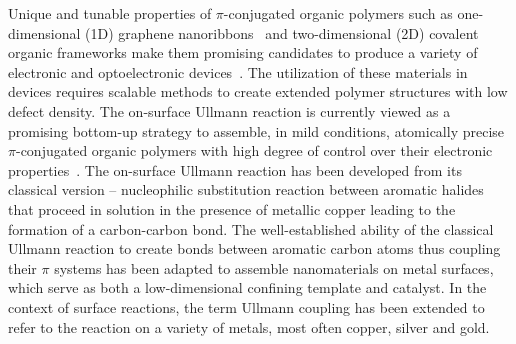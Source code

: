 \documentclass[%
 reprint,
 amsmath,amssymb,
 aps,
prb,
floatfix,
]{revtex4-2}
\newcommand{\lock}{\color{red}}
\newcommand{\lock}{\color{black}}
\newcommand{\comm}{\color{Purple}} %
\begin{document}
{\lock


Unique and tunable properties of $\pi$-conjugated organic polymers such as one-dimensional (1D) graphene nanoribbons~\cite{ullmann_106, ullmann_45, ullmann_107, ullmann_101}
and two-dimensional (2D) covalent organic frameworks 
make them promising candidates to produce a variety of electronic and optoelectronic devices~\cite{ullmann_113, ullmann_114}.
%
The utilization of these materials in devices requires scalable methods to create extended polymer structures with low defect density.
%
The on-surface Ullmann reaction is currently viewed as a promising bottom-up strategy to assemble, in mild conditions, atomically precise $\pi$-conjugated organic polymers with high degree of control over their electronic properties~\cite{ullmann_33}. 
%
%
The on-surface Ullmann reaction has been developed from its classical version -- nucleophilic substitution reaction between aromatic halides that proceed in solution in the presence of metallic copper leading to the formation of a carbon-carbon bond. 
The well-established ability of the classical Ullmann reaction to create bonds between aromatic carbon atoms thus coupling their $\pi$ systems has been adapted to assemble nanomaterials on metal surfaces, which serve as both a low-dimensional confining template and catalyst.
In the context of surface reactions, the term Ullmann coupling has been extended to refer to the reaction on a variety of metals, most often copper, silver and gold.

}
\end{document}
